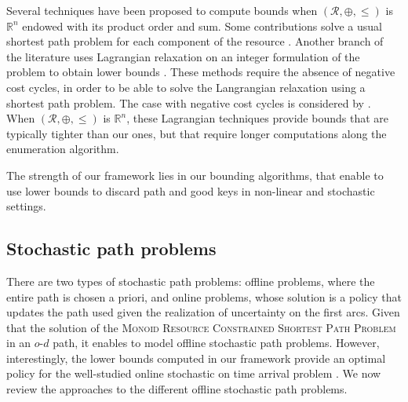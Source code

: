 \documentclass[11pt]{amsart}
\theoremstyle{plain}
\theoremstyle{remark}
\def\R{\mathbb{R}}
\newcommand{\MRCSP}{\textsc{Monoid Resource Constrained Shortest Path Problem}\xspace}
\newcommand{\rplus}{\oplus}
\newcommand{\rleq}{\leqslant}
\newcommand{\rset}{\mathcal{R}}
\begin{document}
Several techniques have been proposed to compute bounds when $(\rset,\rplus,\rleq)$ is $\R^{n}$ endowed with its product order and sum. Some contributions solve a usual shortest path problem for each component of the resource \cite{joksch1966shortest,desrochers1988generalized,dumitrescu2003improved,lozano2013exact}. Another branch of the literature uses Lagrangian relaxation on an integer formulation of the problem to obtain lower bounds \cite{handler1980dual,santos2007improved,carlyle2008lagrangian,dumitrescu2003improved}. These methods require the absence of negative cost cycles, in order to be able to solve the Langrangian relaxation using a shortest path problem. The case with negative cost cycles is considered by \citet{feillet2004exact}. When $(\rset,\rplus,\rleq)$ is $\R^{n}$, these Lagrangian techniques provide bounds that are typically tighter than our ones, but that require longer computations along the enumeration algorithm. 

The strength of our framework lies in our bounding algorithms, that enable to use lower bounds to discard path and good keys in non-linear and stochastic settings. 














\subsection{Stochastic path problems} \label{sub:stochastic_paths_problems}

There are two types of stochastic path problems: offline problems, where the entire path is chosen a priori, and online problems, whose solution is a policy that updates the path used given the realization of uncertainty on the first arcs. Given that the solution of the \MRCSP in an $o$-$d$ path, it enables to model offline stochastic path problems. However, interestingly, the lower bounds computed in our framework provide an optimal policy \cite{parmentier2016thesis} for the well-studied online stochastic on time arrival problem \citep{fu2001adaptive,fu1998expected,hall1986fastest,fan2006optimal,nie2006arriving,samaranayake2012tractable,sabran2014precomputation,flajolet2014robust}. We now review the approaches to the different offline stochastic path problems.
\end{document}
